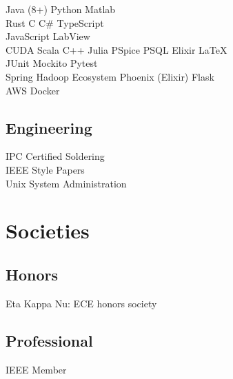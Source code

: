 \documentclass[letterpaper]{deedy-resume-openfont} %
\begin{document}
\begin{minipage}[t]{0.33\textwidth}
 Java (8+) \textbullet{} Python \textbullet{} Matlab  \\
Rust \textbullet{}  C \textbullet{}  C\# \textbullet{} TypeScript \\
 JavaScript\textbullet{} LabView\\
CUDA  \textbullet{} Scala \textbullet{} C++ \textbullet{} Julia \textbullet{} PSpice  \textbullet{} PSQL \textbullet{} Elixir \textbullet{} \LaTeX \\
JUnit \textbullet{} Mockito \textbullet{} Pytest \\
Spring \textbullet{} Hadoop Ecosystem \textbullet{} Phoenix (Elixir) \textbullet{} Flask\\
AWS\textbullet{} Docker


\sectionspace %

\subsection{Engineering}
IPC Certified Soldering \\
IEEE Style Papers \\
Unix System  Administration

\section{Societies}
\subsection{Honors}
 Eta Kappa Nu: ECE honors society \\
\subsection{Professional}
IEEE Member

\sectionspace %

\end{minipage} %
\hfill
%
\end{document}
